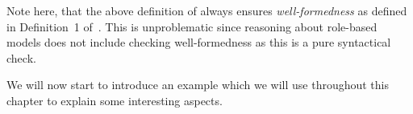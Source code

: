 %

Note here, that the above definition of \SCROM always ensures \emph{well-formedness} as defined in
Definition~1 of~\cite{KBG-SLE15}. This is unproblematic since reasoning about role-based models does
not include checking well-formedness as this is a pure syntactical check.

We will now start to introduce an example which we will use throughout this chapter to explain some
interesting aspects. 

